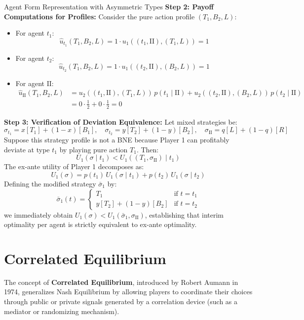 \documentclass[12pt, a4paper]{article}
\begin{document}
\begin{exbox}{Agent Form Representation with Asymmetric Types}
\textbf{Step 2: Payoff Computations for Profiles:}
Consider the pure action profile $(T_1, B_2, L)$:
\begin{itemize}
    \item For agent $t_1$:
    \[
      \hat{u}_{t_1}(T_1, B_2, L) = 1 \cdot u_1((t_1, \text{II}), (T_1, L)) = 1
    \]
    \item For agent $t_2$:
    \[
      \hat{u}_{t_2}(T_1, B_2, L) = 1 \cdot u_1((t_2, \text{II}), (B_2, L)) = 1
    \]
    \item For agent $\text{II}$:
    \begin{align*}
      \hat{u}_{\text{II}}(T_1, B_2, L) &= u_2((t_1, \text{II}), (T_1, L)) \, p(t_1 \mid \text{II}) + u_2((t_2, \text{II}), (B_2, L)) \, p(t_2 \mid \text{II}) \\
      &= 0 \cdot \frac{1}{2} + 0 \cdot \frac{1}{2} = 0
    \end{align*}
\end{itemize}

\textbf{Step 3: Verification of Deviation Equivalence:}
Let mixed strategies be:
\[
  \sigma_{t_1} = x [T_1] + (1-x)[B_1], \quad \sigma_{t_2} = y [T_2] + (1-y)[B_2], \quad \sigma_{\text{II}} = q [L] + (1-q)[R]
\]
Suppose this strategy profile is not a BNE because Player 1 can profitably deviate at type $t_1$ by playing pure action $T_1$. Then:
\[
  U_1(\sigma \mid t_1) < U_1((T_1, \sigma_{\text{II}}) \mid t_1)
\]
The ex-ante utility of Player 1 decomposes as:
\[
  U_1(\sigma) = p(t_1) \, U_1(\sigma \mid t_1) + p(t_2) \, U_1(\sigma \mid t_2)
\]
Defining the modified strategy $\bar{\sigma}_1$ by:
\[
  \bar{\sigma}_1(t) = \begin{cases} T_1 & \text{if } t = t_1 \\ y[T_2] + (1-y)[B_2] & \text{if } t = t_2 \end{cases}
\]
we immediately obtain $U_1(\sigma) < U_1(\bar{\sigma}_1, \sigma_{\text{II}})$, establishing that interim optimality per agent is strictly equivalent to ex-ante optimality.
\end{exbox}

\newpage
\section{Correlated Equilibrium}

The concept of \textbf{Correlated Equilibrium}, introduced by Robert Aumann in 1974, generalizes Nash Equilibrium by allowing players to coordinate their choices through public or private signals generated by a correlation device (such as a mediator or randomizing mechanism).
\end{document}
